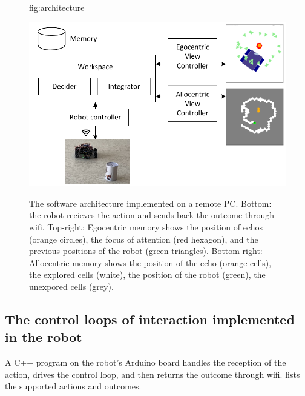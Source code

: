 \documentclass[pmlr]{jmlr}%
\begin{document}
\begin{figure}[htbp]
	\floatconts
	{fig:architecture}
	{\caption{The software architecture implemented on a remote PC. 
			Bottom: the robot recieves the action and sends back the outcome through wifi.
			Top-right: Egocentric memory shows the position of echos (orange circles), the focus of attention (red hexagon), and the previous positions of the robot (green triangles).
			Bottom-right: Allocentric memory shows the position of the echo (orange cells), the explored cells (white), the position of the robot (green), the unexpored cells (grey).}}
	{\includegraphics[width=0.8\linewidth]{images/Figure_2_Architecture}}
\end{figure}


\subsection{The control loops of interaction implemented in the robot}

A C++ program on the robot's Arduino board handles the reception of the action, drives the control loop, and then returns the outcome through wifi. 
 lists the supported actions and outcomes.
\end{document}
